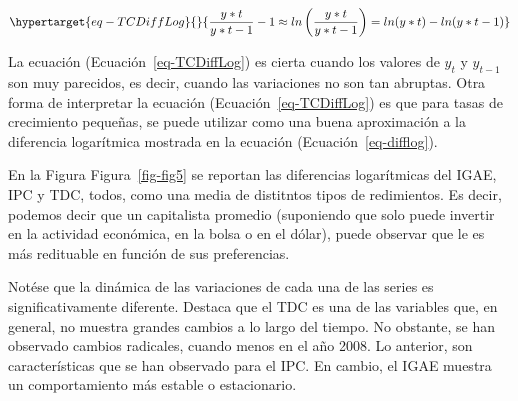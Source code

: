 \documentclass[
  a4paper,
]{article}
\begin{document}
\begin{equation}\protect\hypertarget{eq-TCDiffLog}{}{
\frac{y*t}{y*{t-1}} -1 \approx ln \left( \frac{y*t}{y*{t-1}} \right) = ln(y*t) - ln(y*{t-1})
}\label{eq-TCDiffLog}\end{equation}

La ecuación (Ecuación~\ref{eq-TCDiffLog}) es cierta cuando los valores
de \(y_t\) y \(y_{t-1}\) son muy parecidos, es decir, cuando las
variaciones no son tan abruptas. Otra forma de interpretar la ecuación
(Ecuación~\ref{eq-TCDiffLog}) es que para tasas de crecimiento pequeñas,
se puede utilizar como una buena aproximación a la diferencia
logarítmica mostrada en la ecuación (Ecuación~\ref{eq-difflog}).

En la Figura Figura~\ref{fig-fig5} se reportan las diferencias
logarítmicas del IGAE, IPC y TDC, todos, como una media de distitntos
tipos de redimientos. Es decir, podemos decir que un capitalista
promedio (suponiendo que solo puede invertir en la actividad económica,
en la bolsa o en el dólar), puede observar que le es más redituable en
función de sus preferencias.

Notése que la dinámica de las variaciones de cada una de las series es
significativamente diferente. Destaca que el TDC es una de las variables
que, en general, no muestra grandes cambios a lo largo del tiempo. No
obstante, se han observado cambios radicales, cuando menos en el año
2008. Lo anterior, son características que se han observado para el IPC.
En cambio, el IGAE muestra un comportamiento más estable o estacionario.


\printbibliography
\end{document}
